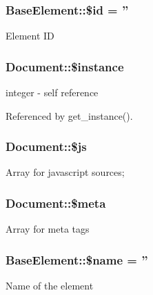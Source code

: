 \subsubsection[{\$id}]{\setlength{\rightskip}{0pt plus 5cm}BaseElement::\$id = ''}\label{classBaseElement_a11b6989c43b53869a09f5ce65aa55b45}
Element ID 
\subsubsection[{\$instance}]{\setlength{\rightskip}{0pt plus 5cm}Document::\$instance}\label{classDocument_a2699d681667ea5a811ec6da1bf2a5087}
integer -\/ self reference 

Referenced by get\_\-instance().

\subsubsection[{\$js}]{\setlength{\rightskip}{0pt plus 5cm}Document::\$js}\label{classDocument_aff8d5c694d27719238793df5c3dbe55f}
Array for javascript sources; 
\subsubsection[{\$meta}]{\setlength{\rightskip}{0pt plus 5cm}Document::\$meta}\label{classDocument_a4b2a3fc78ec084611daef3343dca3756}
Array for meta tags 
\subsubsection[{\$name}]{\setlength{\rightskip}{0pt plus 5cm}BaseElement::\$name = ''}\label{classBaseElement_a30b8cff187a9de659a70daf287d66f45}
Name of the element 

